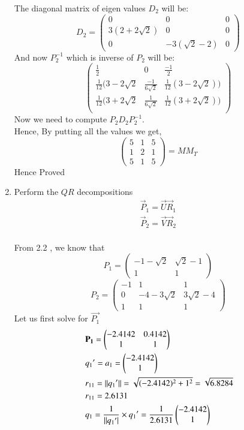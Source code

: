 \documentclass[journal,12pt,twocolumn]{IEEEtran}
\renewcommand\thesection{\arabic{section}}
\begin{document}
\begin{enumerate}[label=\thesection.\arabic*.,ref=\thesection.\theenumi]
$$$$
The diagonal matrix of eigen values $D_2$ will be:
$$
D_2=\begin{pmatrix}
0 & 0 & 0\\
3(2+2\sqrt{2}) & 0 & 0\\
0 & -3(\sqrt{2}-2) & 0
\end{pmatrix}
$$
And now $P_2^{-1}$ which is inverse of $P_2$ will be:
$$
\begin{pmatrix}
\frac{1}{2} & 0 & \frac{-1}{2}\\
\frac{1}{12}(3-2\sqrt{2} & \frac{-1}{6\sqrt{2}} & \frac{1}{12}(3-2\sqrt{2}))\\
\frac{1}{12}(3+2\sqrt{2} & \frac{1}{6\sqrt{2}} & \frac{1}{12}(3+2\sqrt{2}))\\
\end{pmatrix}
$$
Now we need to compute $P_2D_2P_2^{-1}$.\\
Hence, By putting all the values we get, 
$$
\begin{pmatrix}
5&1&5\\
1&2&1\\
5&1&5 
\end{pmatrix} =MM_T
$$
Hence Proved
\item Perform the $QR$ decompositions
\begin{align}
\vec{P}_1 = \vec{U}\vec{R}_1\\
\vec{P}_2 = \vec{V}\vec{R}_2
\end{align}
\solution\\
From 2.2 , we know that 
$$
P_1 =\begin{pmatrix}
-1-\sqrt{2} & \sqrt{2}-1\\
1 & 1
\end{pmatrix}
$$
$$
P_2=\begin{pmatrix}
-1 &1& 1\\
0 & -4-3\sqrt{2} & 3\sqrt{2}-4\\
1 & 1 & 1
\end{pmatrix} 
$$
Let us first solve for $\vec{P_1}$\\
\begin{align*}
& \vec{P_1}=\myvec{-2.4142 & 0.4142\\1 & 1}\\
& q_1{'}=a_1=\myvec{-2.4142 \\1 }\\
& r_{11}=||q_1{'}||=\sqrt{(-2.4142)^2+1^2}=\sqrt{6.8284}\\\
& r_{11}=2.6131\\
& q_1=\frac{1}{||q_1{'}|}\times q_1{'}=\frac{1}{2.6131}\myvec{-2.4142 \\1}\\

\end{align*}
\end{enumerate}
\end{document}
